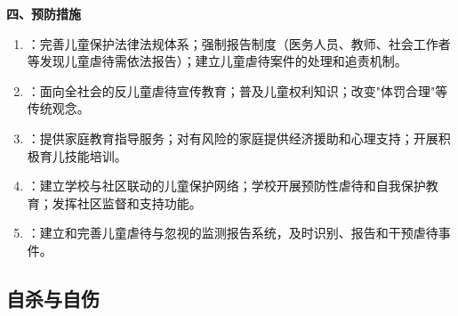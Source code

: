 \begin{keybox}
\textbf{四、预防措施}
\begin{enumerate}[leftmargin=*]
    \item {}：完善儿童保护法律法规体系；强制报告制度（医务人员、教师、社会工作者等发现儿童虐待需依法报告）；建立儿童虐待案件的处理和追责机制。
    \item {}：面向全社会的反儿童虐待宣传教育；普及儿童权利知识；改变"体罚合理"等传统观念。
    \item {}：提供家庭教育指导服务；对有风险的家庭提供经济援助和心理支持；开展积极育儿技能培训。
    \item {}：建立学校与社区联动的儿童保护网络；学校开展预防性虐待和自我保护教育；发挥社区监督和支持功能。
    \item {}：建立和完善儿童虐待与忽视的监测报告系统，及时识别、报告和干预虐待事件。
\end{enumerate}
\end{keybox}

\subsection{自杀与自伤}

